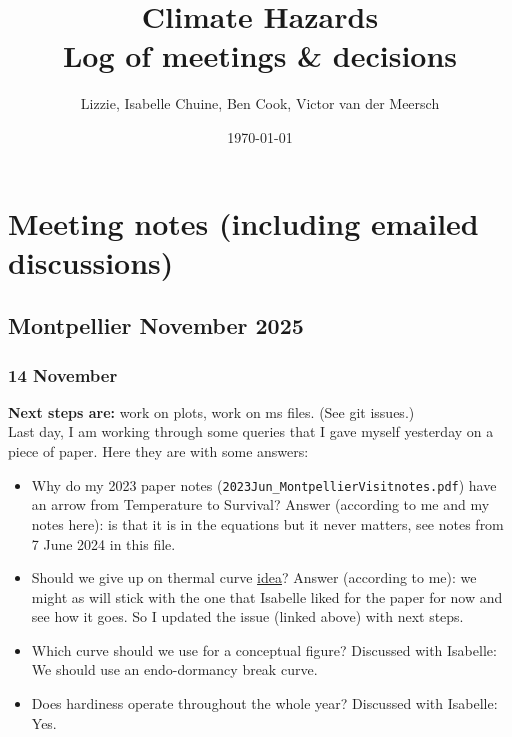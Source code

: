 \documentclass[11pt,letter]{article}
\begin{document}

\renewcommand{\refname}{\CHead{}}

\title{Climate Hazards \\ Log of meetings \& decisions}
\author{Lizzie, Isabelle Chuine, Ben Cook, Victor van der Meersch}
\date{\today}
\maketitle
\tableofcontents

\setlength{\parindent}{0pt}
\setlength{\parskip}{3pt}

\section{Meeting notes (including emailed discussions)}

\subsection{Montpellier November 2025}

\subsubsection{14 November}

{\bf Next steps are:} work on plots, work on ms files. (See git issues.)\\

Last day, I am working through some queries that I gave myself yesterday on a piece of paper. Here they are with some answers: 

\begin{itemize}
\item Why do my 2023 paper notes (\verb|2023Jun_MontpellierVisitnotes.pdf|) have an arrow from Temperature to Survival? Answer (according to me and my notes here): is that it is in the equations but it never matters, see notes from 7 June 2024 in this file.
\item Should we give up on thermal curve \href{https://github.com/lizzieinvancouver/climatehazards/issues/16}{idea}? Answer (according to me): we might as will stick with the one that Isabelle liked for the paper for now and see how it goes. So I updated the issue (linked above) with next steps.
\item Which curve should we use for a conceptual figure? Discussed with Isabelle: We should use an endo-dormancy break curve.
\item Does hardiness operate throughout the whole year? Discussed with Isabelle: Yes.
\end{itemize}
\end{document}
